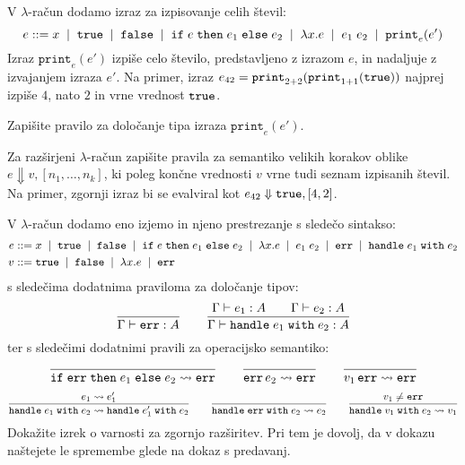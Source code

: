 \documentclass[arhiv]{izpit}
\begin{document}
\naloga[\tocke{20}]

\newcommand{\printint}[2]{\mathtt{print}_{#1}(#2)}
V $\lambda$-račun dodamo izraz za izpisovanje celih števil:
\[
  e \bnfis
  x \bnfor
  \tru \bnfor
  \fls \bnfor
  \conditional{e}{e_1}{e_2} \bnfor
  \fun{x}{e} \bnfor
  e_1 \; e_2 \bnfor
  \printint{e}{e'}
\]
Izraz $\printint{e}{e'}$ izpiše celo število, predstavljeno z izrazom $e$, in nadaljuje z izvajanjem izraza $e'$. Na primer, izraz $e_{42} = \printint{2 + 2}{\printint{1 + 1}{\tru}}$ najprej izpiše $4$, nato $2$ in vrne vrednost $\mathtt{true}$.

\podnaloga
  Zapišite pravilo za določanje tipa izraza $\printint{e}{e'}$.

\podnaloga
  Za razširjeni $\lambda$-račun zapišite pravila za semantiko velikih korakov oblike $e \Downarrow v, [n_1, \dots, n_k]$, ki poleg končne vrednosti $v$ vrne tudi seznam izpisanih števil. Na primer, zgornji izraz bi se evalviral kot $e_{42} \Downarrow \mathtt{true}, [4, 2]$.

\nadaljevanje

\naloga[\tocke{20}]
\newcommand{\handle}[2]{\mathtt{handle}\;#1\;\mathtt{with}\;#2}
V $\lambda$-račun dodamo eno izjemo in njeno prestrezanje s sledečo sintakso:
\begin{align*}
  e &\bnfis
  x \bnfor
  \tru \bnfor
  \fls \bnfor
  \conditional{e}{e_1}{e_2} \bnfor
  \fun{x}{e} \bnfor
  e_1 \; e_2 \bnfor
  \error \bnfor
  \handle{e_1}{e_2} \\
  v &\bnfis
  \tru \bnfor
  \fls \bnfor
  \fun{x}{e} \bnfor
  \error
\end{align*}
s sledečima dodatnima praviloma za določanje tipov:
\[
\frac{
  \hbox{}
}{
  \Gamma \vdash \error : A
}
\qquad
\frac{
  \Gamma \vdash e_1 : A
  \qquad
  \Gamma \vdash e_2 : A
}{
  \Gamma \vdash \handle{e_1}{e_2} : A
}
\]
ter s sledečimi dodatnimi pravili za operacijsko semantiko:
\[
\frac{
  \hbox{}
}{
  \mathtt{if}\;\mathtt{err}\;\mathtt{then}\;e_1\;\mathtt{else}\;e_2 \leadsto \mathtt{err}
}
\qquad
\frac{
  \hbox{}
}{
  \mathtt{err} \, e_2 \leadsto \mathtt{err}
}
\qquad
\frac{
  \hbox{}
}{
  v_1 \, \mathtt{err} \leadsto \mathtt{err}
}
\]
\[
\frac{
  e_1 \leadsto e_1'
}{
  \handle{e_1}{e_2} \leadsto \handle{e_1'}{e_2}
}
\qquad
\frac{
}{
  \handle{\error}{e_2} \leadsto e_2
}
\qquad
\frac{
  v_1 \neq \error
}{
  \handle{v_1}{e_2} \leadsto v_1
}
\]
Dokažite izrek o varnosti za zgornjo razširitev. Pri tem je dovolj, da v dokazu naštejete le spremembe glede na dokaz s predavanj.
\end{document}
